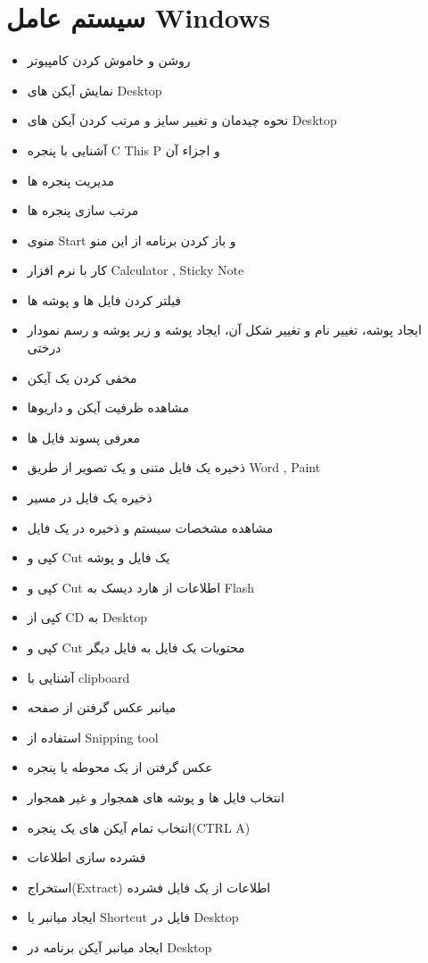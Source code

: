 \chapter{سیستم عامل Windows}
\begin{itemize}
\item
روشن و خاموش کردن کامپیوتر
\item
نمایش آیکن های Desktop
\item
نحوه چیدمان و تغییر سایز و مرتب کردن آیکن های Desktop
\item
آشنایی با پنجره C This P و اجزاء آن
\item
مدیریت پنجره ها
\item
مرتب سازی پنجره ها
\item
منوی Start و باز کردن برنامه از این منو
\item
کار با نرم افزار Calculator , Sticky Note
\item
فیلتر کردن فایل ها و پوشه ها
\item
ایجاد پوشه، تغییر نام و تغییر شکل آن، ایجاد پوشه و زیر پوشه و رسم نمودار درختی
\item
مخفی کردن یک آیکن
\item
مشاهده ظرفیت آیکن و داریوها
\item
معرفی پسوند فایل ها
\item
ذخیره یک فایل متنی و یک تصویر از طریق Word , Paint
\item
ذخیره یک فایل در مسیر
\item
مشاهده مشخصات سیستم و ذخیره در یک فایل
\item
کپی و Cut یک فایل و پوشه
\item
کپی و Cut اطلاعات از هارد دیسک به Flash
\item
کپی از CD به Desktop
\item
کپی و Cut محتویات یک فایل به فایل دیگر
\item
آشنایی با clipboard
\item
میانبر عکس گرفتن از صفحه
\item
استفاده از Snipping tool
\item
عکس گرفتن از یک محوطه یا پنجره
\item
انتخاب فایل ها و پوشه های همجوار و غیر همجوار
\item
انتخاب تمام آیکن های یک پنجره(CTRL A)
\item
فشرده سازی اطلاعات
\item
استخراج(Extract) اطلاعات از یک فایل فشرده
\item
ایجاد میانبر یا Shortcut فایل در Desktop
\item
ایجاد میانبر آیکن برنامه در Desktop

\end{itemize}
